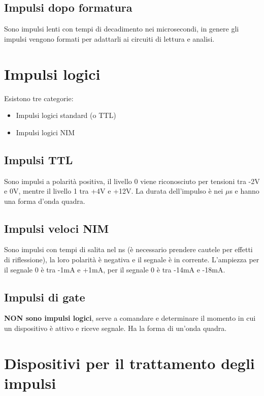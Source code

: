 \subsection{Impulsi dopo formatura}
Sono impulsi lenti con tempi di decadimento nei microsecondi, in genere gli impulsi vengono formati per adattarli ai circuiti di lettura e analisi.
\section{Impulsi logici}
Esistono tre categorie:
\begin{itemize}
\item Impulsi logici standard (o TTL)
\item Impulsi logici NIM
\end{itemize}
\subsection{Impulsi TTL}
Sono impulsi a polarit\`a positiva, il livello 0 viene riconosciuto per tensioni tra -2V e 0V, mentre il livello 1 tra +4V e +12V.
La durata dell'impulso \`e nei $\mu$s e hanno una forma d'onda quadra.
\subsection{Impulsi veloci NIM}
Sono impulsi con tempi di salita nel ns (\`e necessario prendere cautele per effetti di riflessione), la loro polarit\`a \`e negativa e il segnale \`e in corrente.
L'ampiezza per il segnale 0 \`e tra -1mA e +1mA, per il segnale 0 \`e tra -14mA e -18mA.
\subsection{Impulsi di gate}
\textbf{NON sono impulsi logici}, serve a comandare e determinare il momento in cui un dispositivo \`e attivo e riceve segnale.
Ha la forma di un'onda quadra.
\section{Dispositivi per il trattamento degli impulsi}
